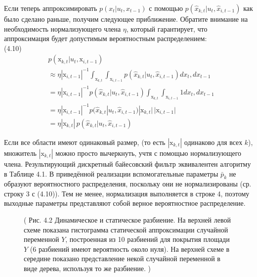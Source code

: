 \documentclass[10pt,a4paper]{article}
\begin{document}
Если теперь аппроксимировать $p(x_t | u_t, x_{t-1})$ с помощью $p(\hat{x}_{k,t}|u_t,\hat{x}_{i,t-1})$ как было сделано раньше, получим следующее приближение. Обратите внимание на необходимость нормализующего члена $\eta$, который гарантирует, что аппроксимация будет допустимым вероятностным распределением:\\

(4.10)
\begin{equation*}
\begin{split}
&p(\text{x}_{k,t}|u_t,\text{x}_{i,t-1})\\
&\approx\eta|\text{x}_{i,t-1}|^{-1}\int_{\text{x}_{k,t}}\int_{\text{x}_{i,t-1}} p(\hat{x}_{k,t}|u_t,\hat{x}_{i,t-1})dx_t,dx_{t-1}\\
&=\eta|\text{x}_{i,t-1}|^{-1}p(\hat{x}_{k,t}|u_t,\hat{x}_{i,t-1})\int_{\text{x}_{k,t}}\int_{\text{x}_{i,t-1}}1dx_t,dx_{t-1}\\
&=\eta|\text{x}_{i,t-1}|^{-1}p(\hat{x}_{k,t}|u_t,\hat{x}_{i,t-1})|\text{x}_{k,t}|\,|\text{x}_{i,t-1}|\\
&=\eta|\text{x}_{k,t}|\,p(\hat{x}_{k,t}|u_t,\hat{x}_{i,t-1})
\end{split}
\end{equation*}

Если все области имеют одинаковый размер, (то есть $|\text{x}_{k,t}|$ одинаково для всех $k$), множитель $|\text{x}_{k,t}|$ можно просто вычеркнуть, учтя с помощью нормализующего члена. Результирующий дискретный байесовский фильтр эквивалентен алгоритму в Таблице 4.1. В приведённой реализации вспомогательные параметры $\bar{p}_k$ не образуют вероятностного распределения, поскольку они не нормализированы (ср. строку 3 с (4.10)). Тем не менее, нормализация выполняется в строке 4, поэтому выходные параметры представляют собой верное вероятностное распределение.\\

\begin{figure}[H]
	\caption{ (  Рис. 4.2 Динамическое и статическое разбиение. На верхней левой схеме показана гистограмма статической аппроксимации случайной переменной $Y$, построенная из 10 разбиений для покрытия площади $Y$ (6 разбиений имеют вероятность около нуля). На верхней схеме в середине показано представление некой случайной переменной в виде дерева, используя то же разбиение. )}
	\label{fig:42orig}
\end{figure}
\end{document}
